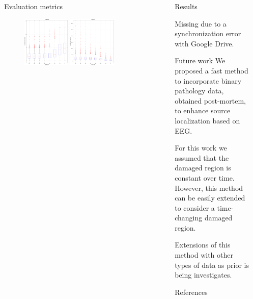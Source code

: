 \documentclass[final]{beamer}
\newlength{\sepwidth}
\newlength{\colwidth}
\newcommand{\separatorcolumn}{\begin{column}{\sepwidth}\end{column}}
\begin{document}
\begin{frame}[t]
\begin{columns}[t]
\begin{column}{\colwidth}
\begin{block}{Evaluation metrics}
\begin{figure}
\centering
\includegraphics[width=0.4\textwidth]{img/boxplot_LocErr}
\includegraphics[width=0.4\textwidth]{img/boxplot_HMS}
\end{figure}

\end{block}

\end{column}

\separatorcolumn

\begin{column}{\colwidth}

\begin{block}{Results}

Missing due to a synchronization error with Google Drive.

\end{block}

\begin{block}{Future work}
We proposed a fast method to incorporate binary pathology data, obtained post-mortem, to enhance source localization based on EEG.

For this work we assumed that the damaged region is constant over time. 
However, this method can be easily extended to consider a time-changing damaged region.

Extensions of this method with other types of data as prior is being investigates.

\end{block}

  \begin{block}{References}
    \footnotesize{}

  \end{block}

\end{column}

\separatorcolumn
\end{columns}
\end{frame}
\end{document}

